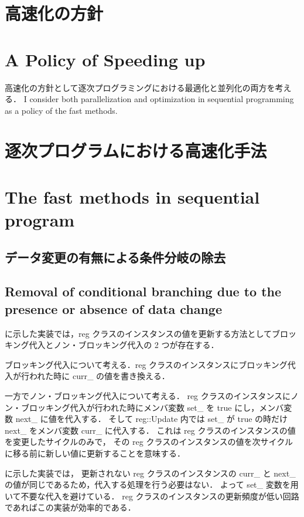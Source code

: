 \section{高速化の方針}
\fi
\section{A Policy of Speeding up}

高速化の方針として逐次プログラミングにおける最適化と並列化の両方を考える．
\fi
I consider both parallelization and optimization in sequential programming
as a policy of the fast methods.

\section{逐次プログラムにおける高速化手法}
\fi
\section{The fast methods in sequential program}

\subsection{データ変更の有無による条件分岐の除去 \label{sss:no_set}}
\fi

\subsection{Removal of conditional branching due to the presence or absence of data change}
\label{sss:no_set}

 に示した実装では，reg クラスのインスタンスの値を更新する方法としてブロッキング代入とノン・ブロッキング代入の 2 つが存在する．

ブロッキング代入について考える．reg クラスのインスタンスにブロッキング代入が行われた時に curr\_ の値を書き換える．

一方でノン・ブロッキング代入について考える．
reg クラスのインスタンスにノン・ブロッキング代入が行われた時にメンバ変数 set\_ を true にし，メンバ変数 next\_ に値を代入する．
そして reg::Update 内では set\_ が true の時だけ next\_ をメンバ変数 curr\_ に代入する．
これは reg クラスのインスタンスの値を変更したサイクルのみで，
その reg クラスのインスタンスの値を次サイクルに移る前に新しい値に更新することを意味する．

 に示した実装では，
更新されない reg クラスのインスタンスの curr\_ と next\_ の値が同じであるため，代入する処理を行う必要はない．
よって set\_ 変数を用いて不要な代入を避けている．
reg クラスのインスタンスの更新頻度が低い回路であればこの実装が効率的である．

